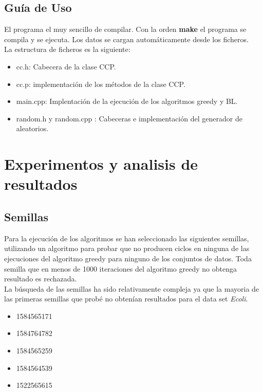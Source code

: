 \section{Guía de Uso}

El programa el muy sencillo de compilar. Con la orden \textbf{make} el programa se compila y se ejecuta. Los datos se cargan automáticamente desde los ficheros.\\
La estructura de ficheros es la siguiente:
\begin{itemize}
   \item cc.h: Cabecera de la clase CCP.
   \item cc.p: implementación de los métodos de la clase CCP.
   \item main.cpp: Implentación de la ejecución de los algoritmos greedy y BL.
   \item random.h y random.cpp : Cabeceras e implementación del generador de aleatorios.
\end{itemize}

\chapter{Experimentos y analisis de resultados}
\section{Semillas}
Para la ejecución de los algoritmos se han seleccionado las siguientes semillas, utilizando un algoritmo para probar que no producen ciclos en ninguna de las ejecuciones del algoritmo greedy para ninguno de los conjuntos de datos. Toda semilla que en menos de 1000 iteraciones del algoritmo greedy no obtenga resultado es rechazada. \\
La búsqueda de las semillas ha sido relativamente compleja ya que la mayoria de las primeras semillas que probé no obtenían resultados para el data set \emph{Ecoli}.
\begin{itemize}
   \item 1584565171
   \item 1584764782
   \item 1584565259
   \item 1584564539
   \item 1522565615
\end{itemize}

